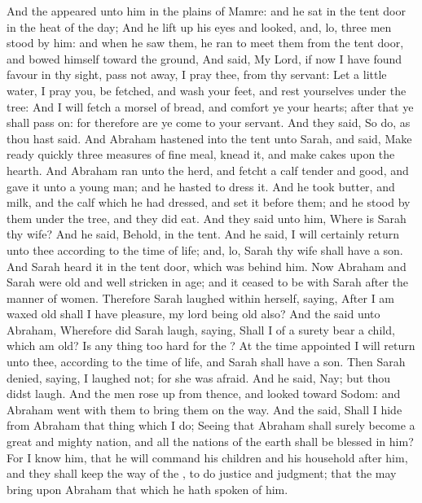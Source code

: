 \begin{biblechapter} %
 And the \LORD appeared unto him in the plains of Mamre: and he sat in the tent door in the heat of the day;
\verse And he lift up his eyes and looked, and, lo, three men stood by him: and when he saw them, he ran to meet them from the tent door, and bowed himself toward the ground,
\verse And said, My Lord, if now I have found favour in thy sight, pass not away, I pray thee, from thy servant:
\verse Let a little water, I pray you, be fetched, and wash your feet, and rest yourselves under the tree:
\verse And I will fetch a morsel of bread, and comfort ye your hearts; after that ye shall pass on: for therefore are ye come to your servant. And they said, So do, as thou hast said.
\verse And Abraham hastened into the tent unto Sarah, and said, Make ready quickly three measures of fine meal, knead it, and make cakes upon the hearth.
\verse And Abraham ran unto the herd, and fetcht a calf tender and good, and gave it unto a young man; and he hasted to dress it.
\verse And he took butter, and milk, and the calf which he had dressed, and set it before them; and he stood by them under the tree, and they did eat.
\verse And they said unto him, Where is Sarah thy wife? And he said, Behold, in the tent.
\verse And he said, I will certainly return unto thee according to the time of life; and, lo, Sarah thy wife shall have a son. And Sarah heard it in the tent door, which was behind him.
\verse Now Abraham and Sarah were old and well stricken in age; and it ceased to be with Sarah after the manner of women.
\verse Therefore Sarah laughed within herself, saying, After I am waxed old shall I have pleasure, my lord being old also?
\verse And the \LORD said unto Abraham, Wherefore did Sarah laugh, saying, Shall I of a surety bear a child, which am old?
\verse Is any thing too hard for the \LORD? At the time appointed I will return unto thee, according to the time of life, and Sarah shall have a son.
\verse Then Sarah denied, saying, I laughed not; for she was afraid. And he said, Nay; but thou didst laugh.
 And the men rose up from thence, and looked toward Sodom: and Abraham went with them to bring them on the way.
\verse And the \LORD said, Shall I hide from Abraham that thing which I do;
\verse Seeing that Abraham shall surely become a great and mighty nation, and all the nations of the earth shall be blessed in him?
\verse For I know him, that he will command his children and his household after him, and they shall keep the way of the \LORD, to do justice and judgment; that the \LORD may bring upon Abraham that which he hath spoken of him.

\end{biblechapter}
